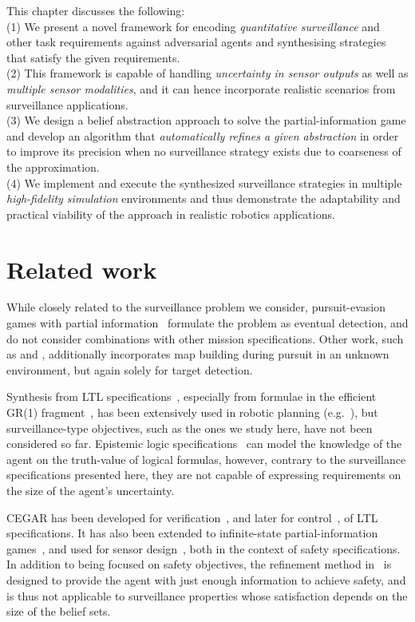 This chapter discusses the following:\\
(1) We present a novel framework for encoding \emph{quantitative surveillance} and other task requirements against adversarial agents and synthesising strategies that satisfy the given requirements.\\
(2) This framework is capable of handling \emph{uncertainty in sensor outputs} as well as \emph{multiple sensor modalities}, and it can hence incorporate realistic scenarios from surveillance applications.  \\
(3) We design a belief abstraction approach to solve the partial-information game and develop an algorithm that \emph{automatically refines a given abstraction} in order to improve its precision when no surveillance strategy exists due to coarseness of the approximation.\\
(4) We implement and execute the synthesized surveillance strategies in multiple \emph{high-fidelity simulation} environments and thus demonstrate the adaptability and practical viability of the approach in realistic robotics applications.



\section{Related work}
While closely related to the surveillance problem we consider, pursuit-evasion games with partial information~\cite{Chung2011, Chin2010, Antoniades2003} formulate the problem as eventual detection, and do not consider combinations with other mission specifications. Other work, such as \cite{Vidal2002} and \cite{Kim2001}, additionally incorporates map building during pursuit in an unknown environment, but again solely for target detection.

Synthesis from LTL specifications~\cite{Pnueli1989}, especially from formulae in the efficient GR(1) fragment~\cite{Piterman2006}, has been extensively used in robotic planning (e.g.~\cite{wong2012,Kress2007}), but surveillance-type objectives, such as the ones we study here, have not been considered so far. Epistemic logic specifications~\cite{MeydenV98} can model the knowledge of the agent on the truth-value of logical formulas, however, contrary to the surveillance specifications presented here, they are not capable of expressing requirements on the size of the agent's uncertainty.

CEGAR has been developed for verification~\cite{ClarkeGJLV00}, and later for control~\cite{HenzingerJM03}, of LTL specifications. 
It has also been extended to infinite-state partial-information games~\cite{DimitrovaF08}, and used for sensor design~\cite{FuDT14}, both in the context of safety specifications. In addition to being focused on safety objectives, the refinement method in~\cite{DimitrovaF08} is designed to provide the agent with just enough information to achieve safety, and is thus not applicable to surveillance properties whose satisfaction depends on the size of the belief sets.

